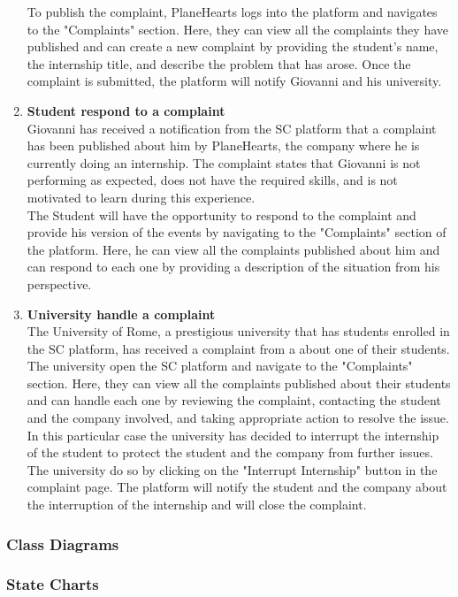 \begin{enumerate}
        To publish the complaint, PlaneHearts logs into the platform and navigates to the "Complaints" section. Here, they can view all the complaints they have published and can create a new complaint by providing the student's name, the internship title, and describe the problem that has arose. Once the complaint is submitted, the platform will notify Giovanni and his university.
    \item \textbf{Student respond to a complaint}\\
        Giovanni has received a notification from the SC platform that a complaint has been published about him by PlaneHearts, the company where he is currently doing an internship. The complaint states that Giovanni is not performing as expected, does not have the required skills, and is not motivated to learn during this experience.\\
        The Student will have the opportunity to respond to the complaint and provide his version of the events by navigating to the "Complaints" section of the platform. Here, he can view all the complaints published about him and can respond to each one by providing a description of the situation from his perspective.
    \item \textbf{University handle a complaint}\\
        The University of Rome, a prestigious university that has students enrolled in the SC platform, has received a complaint from a about one of their students. The university open the SC platform and navigate to the "Complaints" section. Here, they can view all the complaints published about their students and can handle each one by reviewing the complaint, contacting the student and the company involved, and taking appropriate action to resolve the issue.
        In this particular case the university has decided to interrupt the internship of the student to protect the student and the company from further issues. The university do so by clicking on the "Interrupt Internship" button in the complaint page. The platform will notify the student and the company about the interruption of the internship and will close the complaint.
\end{enumerate}


\subsubsection{Class Diagrams}

\subsubsection{State Charts}


